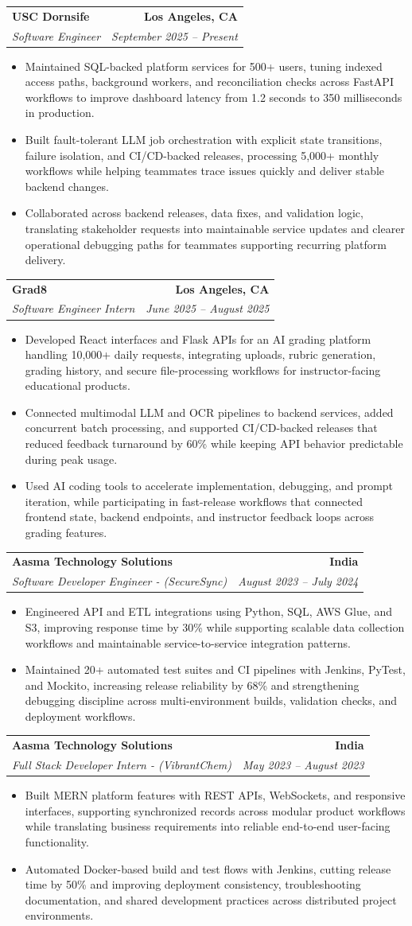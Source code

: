 \documentclass[letterpaper,10pt]{article}
\makeatletter
\newcommand{\resumeItem}[1]{\item\small{{#1 \vspace{-2pt}}}}
\newcommand{\resumeSubheading}[4]{\vspace{-1pt}\item\begin{tabular*}{1.0\textwidth}[t]{l@{\extracolsep{\fill}}r}\textbf{#1} & \textbf{\small #2} \\\textit{\small#3} & \textit{\small #4} \\\end{tabular*}\vspace{-2pt}}
\newcommand{\resumeItemListStart}{\begin{itemize}[leftmargin=0.15in,label=\textbullet,itemsep=2pt,topsep=0pt,parsep=0pt,partopsep=0pt]}
\newcommand{\resumeItemListEnd}{\end{itemize}\vspace{-4pt}}
\makeatother
\begin{document}
\resumeSubheading{USC Dornsife}{Los Angeles, CA}{Software Engineer}{September 2025 -- Present}
\resumeItemListStart
\resumeItem{Maintained SQL-backed platform services for 500+ users, tuning indexed access paths, background workers, and reconciliation checks across FastAPI workflows to improve dashboard latency from 1.2 seconds to 350 milliseconds in production.}
\resumeItem{Built fault-tolerant LLM job orchestration with explicit state transitions, failure isolation, and CI/CD-backed releases, processing 5,000+ monthly workflows while helping teammates trace issues quickly and deliver stable backend changes.}
\resumeItem{Collaborated across backend releases, data fixes, and validation logic, translating stakeholder requests into maintainable service updates and clearer operational debugging paths for teammates supporting recurring platform delivery.}
\resumeItemListEnd

\resumeSubheading{Grad8}{Los Angeles, CA}{Software Engineer Intern}{June 2025 -- August 2025}
\resumeItemListStart
\resumeItem{Developed React interfaces and Flask APIs for an AI grading platform handling 10,000+ daily requests, integrating uploads, rubric generation, grading history, and secure file-processing workflows for instructor-facing educational products.}
\resumeItem{Connected multimodal LLM and OCR pipelines to backend services, added concurrent batch processing, and supported CI/CD-backed releases that reduced feedback turnaround by 60\% while keeping API behavior predictable during peak usage.}
\resumeItem{Used AI coding tools to accelerate implementation, debugging, and prompt iteration, while participating in fast-release workflows that connected frontend state, backend endpoints, and instructor feedback loops across grading features.}
\resumeItemListEnd

\resumeSubheading{Aasma Technology Solutions}{India}{Software Developer Engineer - (SecureSync)}{August 2023 -- July 2024}
\resumeItemListStart
\resumeItem{Engineered API and ETL integrations using Python, SQL, AWS Glue, and S3, improving response time by 30\% while supporting scalable data collection workflows and maintainable service-to-service integration patterns.}
\resumeItem{Maintained 20+ automated test suites and CI pipelines with Jenkins, PyTest, and Mockito, increasing release reliability by 68\% and strengthening debugging discipline across multi-environment builds, validation checks, and deployment workflows.}
\resumeItemListEnd

\resumeSubheading{Aasma Technology Solutions}{India}{Full Stack Developer Intern - (VibrantChem)}{May 2023 -- August 2023}
\resumeItemListStart
\resumeItem{Built MERN platform features with REST APIs, WebSockets, and responsive interfaces, supporting synchronized records across modular product workflows while translating business requirements into reliable end-to-end user-facing functionality.}
\resumeItem{Automated Docker-based build and test flows with Jenkins, cutting release time by 50\% and improving deployment consistency, troubleshooting documentation, and shared development practices across distributed project environments.}
\resumeItemListEnd
\end{document}
